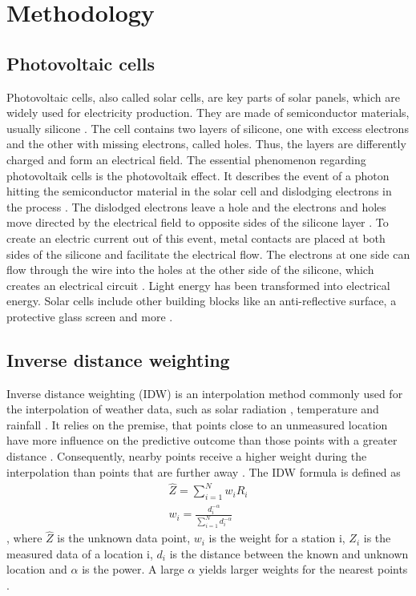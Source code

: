 \documentclass{article}
\begin{document}
\section{Methodology}
\subsection{Photovoltaic cells}\label{sec:pv}

Photovoltaic cells, also called solar cells, are key parts of solar panels, which are widely used for electricity production.
They are made of semiconductor materials, usually silicone \cite{Goetzberger2002}. The cell contains two layers of silicone, one with excess electrons and the other with missing electrons, called holes. Thus, the layers are differently charged and form an electrical field. 
The essential phenomenon regarding photovoltaik cells is the photovoltaik effect. It describes the event of a photon hitting the semiconductor material in the solar cell and dislodging electrons in the process \cite{Ndiaye2013}. The dislodged electrons leave a hole and the electrons and holes move directed by the electrical field to opposite sides of the silicone layer \cite{SolarCells}. To create an electric current out of this event, metal contacts are placed at both sides of the silicone and facilitate the electrical flow. The electrons at one side can flow through the wire into the holes at the other side of the silicone, which creates an electrical circuit \cite{SolarCells}. Light energy has been transformed into electrical energy. Solar cells include other building blocks like an anti-reflective surface, a protective glass screen and more \cite{SolarCells}.

\subsection{Inverse distance weighting}
Inverse distance weighting (IDW) is an interpolation method commonly used for the interpolation of weather data, such as solar radiation \cite{Loghmari2018}, temperature \cite{Cao2009} and rainfall \cite{Chen2012}. 
It relies on the premise, that points close to an unmeasured location have more influence on the predictive outcome than those points with a greater distance \cite{Chen2012}. 
Consequently, nearby points receive a higher weight during the interpolation than points that are further away \cite{Lu2008}. 
The IDW formula is defined as
\begin{align}
    \hat{Z} = \sum_{i=1}^N w_iR_i \\
    w_i = \frac{d_i^{-\alpha}}{\sum_{i=1}^N{d_i^{-\alpha}}}
\end{align} \cite{Chen2012},
 where $\hat{Z}$ is the unknown data point, $w_i$ is the weight for a station i, $Z_i$ is the measured data of a location i, $d_i$ is the distance between the known and unknown location and $\alpha$ is the power. 
 A large $\alpha$ yields larger weights for the nearest points \cite{Lu2008}.
\end{document}
